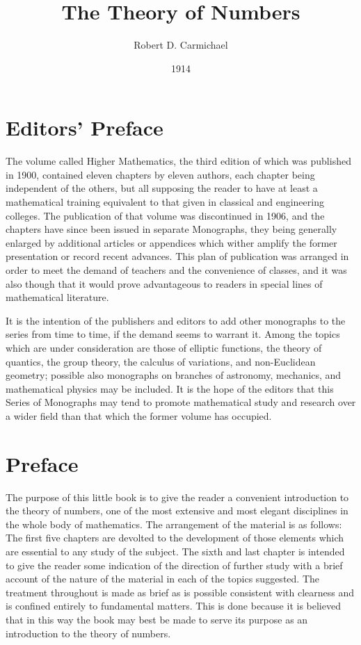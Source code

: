 \documentclass[oneside,12pt]{book}
\begin{document}
    
\frontmatter

\title{The Theory of Numbers}
\author{Robert D. Carmichael}
\date{1914}
\maketitle 

\chapter{Editors' Preface}
The volume called Higher Mathematics, the third edition of which was published in 1900, contained eleven chapters by eleven authors, each chapter being independent of the others, but all supposing the reader to have at least a mathematical training equivalent to that given in classical and engineering colleges. The publication of that volume was discontinued in 1906, and the chapters have since been issued in separate Monographs, they being generally enlarged by additional articles or appendices which wither amplify the former presentation or record recent advances. This plan of publication was arranged in order to meet the demand of teachers and the convenience of classes, and it was also though that it would prove advantageous to readers in special lines of mathematical literature. \par 

It is the intention of the publishers and editors to add other monographs to the series from time to time, if the demand seems to warrant it. Among the topics which are under consideration are those of elliptic functions, the theory of quantics, the group theory, the calculus of variations, and non-Euclidean geometry; possible also monographs on branches of astronomy, mechanics, and mathematical physics may be included. It is the hope of the editors that this Series of Monographs may tend to promote mathematical study and research over a wider field than that which the former volume has occupied. \par 

\chapter{Preface}
The purpose of this little book is to give the reader a convenient introduction to the theory of numbers, one of the most extensive and most elegant disciplines in the whole body of mathematics. The arrangement of the material is as follows: The first five chapters are devolted to the development of those elements which are essential to any study of the subject. The sixth and last chapter is intended to give the reader some indication of the direction of further study with a brief account of the nature of the material in each of the topics suggested. The treatment throughout is made as brief as is possible consistent with clearness and is confined entirely to fundamental matters. This is done because it is believed that in this way the book may best be made to serve its purpose as an introduction to the theory of numbers. \par 
\end{document}
